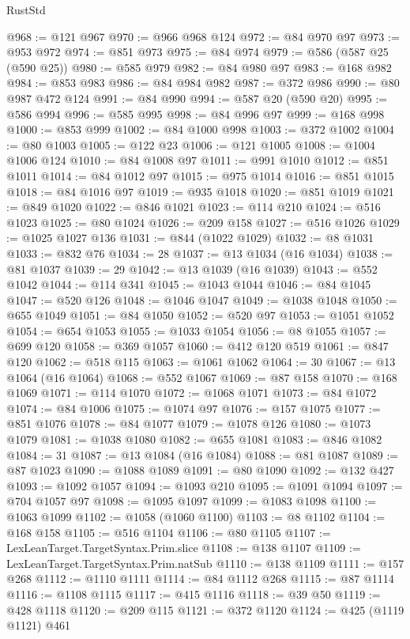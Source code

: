 \begin{lexlean}{RustStd}
\begin{coremodule}
@968 := @121 @967
@970 := @966 @968 @124
@972 := @84 @970 @97
@973 := @953 @972
@974 := @851 @973
@975 := @84 @974
@979 := @586 (@587 @25 (@590 @25))
@980 := @585 @979
@982 := @84 @980 @97
@983 := @168 @982
@984 := @853 @983
@986 := @84 @984 @982
@987 := @372 @986
@990 := @80 @987 @472 @124
@991 := @84 @990
@994 := @587 @20 (@590 @20)
@995 := @586 @994
@996 := @585 @995
@998 := @84 @996 @97
@999 := @168 @998
@1000 := @853 @999
@1002 := @84 @1000 @998
@1003 := @372 @1002
@1004 := @80 @1003
@1005 := @122 @23
@1006 := @121 @1005
@1008 := @1004 @1006 @124
@1010 := @84 @1008 @97
@1011 := @991 @1010
@1012 := @851 @1011
@1014 := @84 @1012 @97
@1015 := @975 @1014
@1016 := @851 @1015
@1018 := @84 @1016 @97
@1019 := @935 @1018
@1020 := @851 @1019
@1021 := @849 @1020
@1022 := @846 @1021
@1023 := @114 @210
@1024 := @516 @1023
@1025 := @80 @1024
@1026 := @209 @158
@1027 := @516 @1026
@1029 := @1025 @1027 @136
@1031 := @844 (@1022 @1029)
@1032 := @8 @1031
@1033 := @832 @76
@1034 := 28
@1037 := @13 @1034 (@16 @1034)
@1038 := @81 @1037
@1039 := 29
@1042 := @13 @1039 (@16 @1039)
@1043 := @552 @1042
@1044 := @114 @341
@1045 := @1043 @1044
@1046 := @84 @1045
@1047 := @520 @126
@1048 := @1046 @1047
@1049 := @1038 @1048
@1050 := @655 @1049
@1051 := @84 @1050
@1052 := @520 @97
@1053 := @1051 @1052
@1054 := @654 @1053
@1055 := @1033 @1054
@1056 := @8 @1055
@1057 := @699 @120
@1058 := @369 @1057
@1060 := @412 @120 @519
@1061 := @847 @120
@1062 := @518 @115
@1063 := @1061 @1062
@1064 := 30
@1067 := @13 @1064 (@16 @1064)
@1068 := @552 @1067
@1069 := @87 @158
@1070 := @168 @1069
@1071 := @114 @1070
@1072 := @1068 @1071
@1073 := @84 @1072
@1074 := @84 @1006
@1075 := @1074 @97
@1076 := @157 @1075
@1077 := @851 @1076
@1078 := @84 @1077
@1079 := @1078 @126
@1080 := @1073 @1079
@1081 := @1038 @1080
@1082 := @655 @1081
@1083 := @846 @1082
@1084 := 31
@1087 := @13 @1084 (@16 @1084)
@1088 := @81 @1087
@1089 := @87 @1023
@1090 := @1088 @1089
@1091 := @80 @1090
@1092 := @132 @427
@1093 := @1092 @1057
@1094 := @1093 @210
@1095 := @1091 @1094
@1097 := @704 @1057 @97
@1098 := @1095 @1097
@1099 := @1083 @1098
@1100 := @1063 @1099
@1102 := @1058 (@1060 @1100)
@1103 := @8 @1102
@1104 := @168 @158
@1105 := @516 @1104
@1106 := @80 @1105
@1107 := LexLeanTarget.TargetSyntax.Prim.slice
@1108 := @138 @1107
@1109 := LexLeanTarget.TargetSyntax.Prim.natSub
@1110 := @138 @1109
@1111 := @157 @268
@1112 := @1110 @1111
@1114 := @84 @1112 @268
@1115 := @87 @1114
@1116 := @1108 @1115
@1117 := @415 @1116
@1118 := @39 @50
@1119 := @428 @1118
@1120 := @209 @115
@1121 := @372 @1120
@1124 := @425 (@1119 @1121) @461

\end{coremodule}
\end{lexlean}

